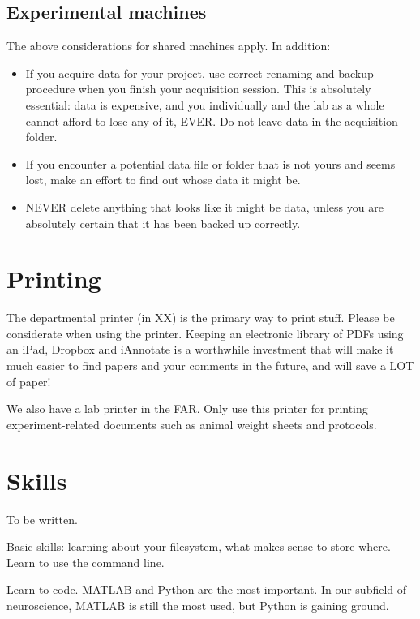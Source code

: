 \documentclass{tufte-book}
\begin{document}
\subsection{Experimental machines}

The above considerations for shared machines apply. In addition:

\begin{itemize}
\item{If you acquire data for your project, use correct renaming and
  backup procedure when you finish your acquisition session. This is
  absolutely essential: data is expensive, and you individually and
  the lab as a whole cannot afford to lose any of it, EVER. Do not
  leave data in the acquisition folder.}
\item{If you encounter a potential data file or folder that is not
  yours and seems lost, make an effort to find out whose data it might
  be.}
\item{NEVER delete anything that looks like it might be data, unless
  you are absolutely certain that it has been backed up correctly.}
\end{itemize}


\section{Printing}

The departmental printer (in XX) is the primary way to print
stuff. Please be considerate when using the printer. Keeping an
electronic library of PDFs using an iPad, Dropbox and iAnnotate is a
worthwhile investment that will make it much easier to find papers and
your comments in the future, and will save a LOT of paper!

We also have a lab printer in the FAR. Only use this printer for
printing experiment-related documents such as animal weight sheets and
protocols.

\section{Skills}

To be written.

Basic skills: learning about your filesystem, what makes sense to
store where. Learn to use the command line.

Learn to code. MATLAB and Python are the most important. In our
subfield of neuroscience, MATLAB is still the most used, but Python is
gaining ground.
\end{document}
